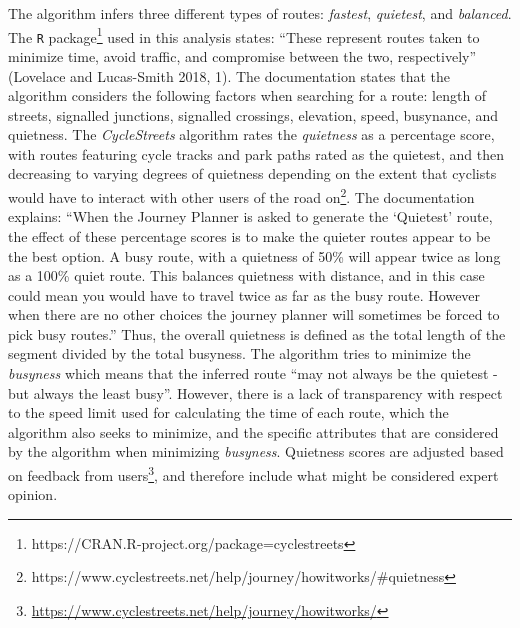 \documentclass[smallextended]{svjour3}       %
\begin{document}
The algorithm infers three different types of routes: \emph{fastest},
\emph{quietest}, and \emph{balanced}. The \texttt{R}
package\footnote{https://CRAN.R-project.org/package=cyclestreets} used
in this analysis states: ``These represent routes taken to minimize
time, avoid traffic, and compromise between the two, respectively''
(Lovelace and Lucas-Smith 2018, 1). The documentation states that the
algorithm considers the following factors when searching for a route:
length of streets, signalled junctions, signalled crossings, elevation,
speed, busynance, and quietness. The \emph{CycleStreets} algorithm rates
the \emph{quietness} as a percentage score, with routes featuring cycle
tracks and park paths rated as the quietest, and then decreasing to
varying degrees of quietness depending on the extent that cyclists would
have to interact with other users of the road
on\footnote{https://www.cyclestreets.net/help/journey/howitworks/\#quietness}.
The documentation explains: ``When the Journey Planner is asked to
generate the `Quietest' route, the effect of these percentage scores is
to make the quieter routes appear to be the best option. A busy route,
with a quietness of 50\% will appear twice as long as a 100\% quiet
route. This balances quietness with distance, and in this case could
mean you would have to travel twice as far as the busy route. However
when there are no other choices the journey planner will sometimes be
forced to pick busy routes.'' Thus, the overall quietness is defined as
the total length of the segment divided by the total busyness. The
algorithm tries to minimize the \emph{busyness} which means that the
inferred route ``may not always be the quietest - but always the least
busy''. However, there is a lack of transparency with respect to the
speed limit used for calculating the time of each route, which the
algorithm also seeks to minimize, and the specific attributes that are
considered by the algorithm when minimizing \emph{busyness}. Quietness
scores are adjusted based on feedback from
users\footnote{\url{https://www.cyclestreets.net/help/journey/howitworks/}},
and therefore include what might be considered expert opinion.
\end{document}
